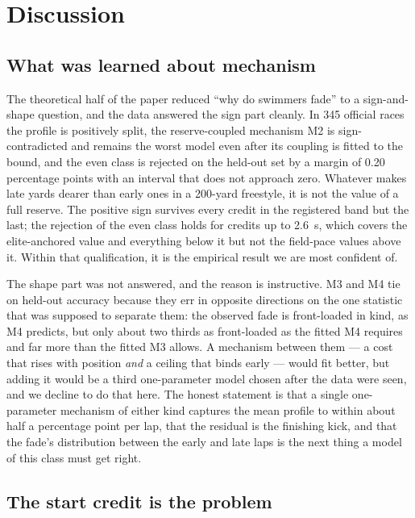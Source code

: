 \section{Discussion}\label{sec:discussion}

\subsection{What was learned about mechanism}

The theoretical half of the paper reduced ``why do swimmers fade'' to a
sign-and-shape question, and the data answered the sign part cleanly. In
345 official races the profile is positively split, the reserve-coupled
mechanism M2 is sign-contradicted and remains the worst model even after
its coupling is fitted to the bound, and the even class is rejected on the
held-out set by a margin of 0.20 percentage points with an interval that
does not approach zero. Whatever makes late yards dearer than early ones in
a 200-yard freestyle, it is not the value of a full reserve. The positive
sign survives every credit in the registered band but the last; the
rejection of the even class holds for credits up to 2.6~s, which covers
the elite-anchored value and everything below it but not the field-pace
values above it. Within that qualification, it is the empirical result we
are most confident of.

The shape part was not answered, and the reason is instructive. M3 and M4
tie on held-out accuracy because they err in opposite directions on the
one statistic that was supposed to separate them: the observed fade is
front-loaded in kind, as M4 predicts, but only about two thirds as
front-loaded as the fitted M4 requires and far more than the fitted M3
allows. A mechanism between them --- a cost that rises with position
\emph{and} a ceiling that binds early --- would fit better, but adding it
would be a third one-parameter model chosen after the data were seen, and
we decline to do that here. The honest statement is that a single
one-parameter mechanism of either kind captures the mean profile to within
about half a percentage point per lap, that the residual is the finishing
kick, and that the fade's distribution between the early and late laps is
the next thing a model of this class must get right.

\subsection{The start credit is the problem}

